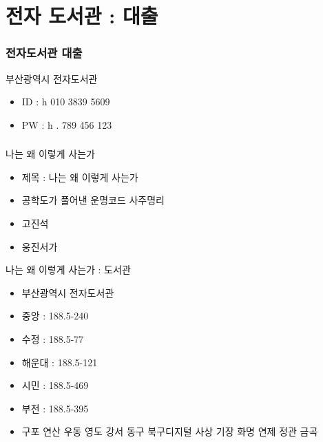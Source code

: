 \documentclass[aspectratio=1610,17pt,xcolor=pdftex,dvipsnames,table,handout]{beamer}
\begin{document}
		\section 	{전자 도서관 : 대출}

		\begin{frame} [t,plain]
		\frametitle{전자도서관 대출}

			\begin{block} {부산광역시 전자도서관}
			\setlength{\leftmargini}{4em}			
			\begin{itemize}
				\item ID : h 010 3839 5609
				\item PW : h . 789 456 123
			\end{itemize}
			\end{block}	


		\end{frame}						

		\begin{frame} [t,plain]
		\frametitle{}


			\begin{block} {나는 왜 이렇게 사는가}
			\setlength{\leftmargini}{4em}			
			\begin{itemize}
				\item 제목 : 나는 왜 이렇게 사는가 
				\item 공학도가 풀어낸 운명코드 사주명리 
				\item 고진석
				\item 웅진서가 
			\end{itemize}
			\end{block}	
					
			\begin{block} {나는 왜 이렇게 사는가 : 도서관}
			\setlength{\leftmargini}{4em}			
			\begin{itemize}
				\item 부산광역시 전자도서관
				\item 중앙 	:	188.5-240	
				\item 수정		:	188.5-77
				\item 해운대	:	188.5-121
				\item 시민		:	188.5-469
				\item 부전		:	188.5-395
				\item 구포 연산 우동 영도 강서 동구 북구디지털 사상 기장 화명 연제 정관 금곡 
			\end{itemize}
			\end{block}	

		\end{frame}						
\end{document}
